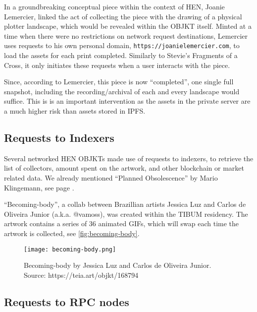 In a groundbreaking conceptual piece within the context of HEN, Joanie Lemercier, linked the act of collecting the piece with the drawing of a physical plotter landscape, which would be revealed within the OBJKT itself. Minted at a time when there were no restrictions on network request destinations, Lemercier uses requests to his own personal domain, \texttt{https://joanielemercier.com}, to load the assets for each print completed. Similarly to Stevie's Fragments of a Cross, it only initiates these requests when a user interacts with the piece.

Since, according to Lemercier, this piece is now ``completed'', one single full snapshot, including the recording/archival of each and every landscape would suffice. This is is an important intervention as the assets in the private server are a much higher risk than assets stored in IPFS.

\subsection{Requests to Indexers}

Several networked HEN OBJKTs made use of requests to indexers, to retrieve the list of collectors, amount spent on the artwork, and other blockchain or market related data.
We already mentioned ``Planned Obsolescence'' by Mario Klingemann, see page \pageref{fig:plannedobsolescence}.

``Becoming-body'', a collab between Brazillian artists Jessica Luz and Carlos de Oliveira Junior (a.k.a. @vamoss), was created within the TIBUM residency. The artwork contains a series of 36 animated GIFs, which will swap each time the artwork is collected, see \autoref{fig:becoming-body}.

\begin{figure}[h]
    \centering
    \captionsetup{justification=centering}
    \texttt{[image: becoming-body.png]}
    \captionsetup{justification=centering}
    \caption[Becoming-body by Jessica Luz and Carlos de Oliveira Junior]{Becoming-body by Jessica Luz and Carlos de Oliveira Junior. \\ Source: https://teia.art/objkt/168794}
    \label{fig:becoming-body}
\end{figure}


\subsection{Requests to RPC nodes}

